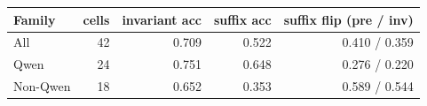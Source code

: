 \begin{tabular}{lrrrr}
\toprule
Family & cells & invariant acc & suffix acc & suffix flip (pre / inv) \\
\midrule
All & 42 & 0.709 & 0.522 & 0.410 / 0.359 \\
Qwen & 24 & 0.751 & 0.648 & 0.276 / 0.220 \\
Non-Qwen & 18 & 0.652 & 0.353 & 0.589 / 0.544 \\
\bottomrule
\end{tabular}
